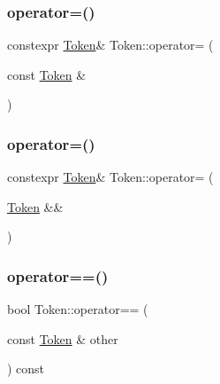 \subsubsection{\texorpdfstring{operator=()}{operator=()}\hspace{0.1cm}{\footnotesize\ttfamily [3/4]}}
{\footnotesize\ttfamily constexpr \hyperlink{class_token}{Token}\& Token\+::operator= (\begin{DoxyParamCaption}\item[{const \hyperlink{class_token}{Token} \&}]{ }\end{DoxyParamCaption})\hspace{0.3cm}{\ttfamily [default]}}

\mbox{\label{class_token_a7fb2d2c0d997137887d41037f47a39ac}} 
\subsubsection{\texorpdfstring{operator=()}{operator=()}\hspace{0.1cm}{\footnotesize\ttfamily [4/4]}}
{\footnotesize\ttfamily constexpr \hyperlink{class_token}{Token}\& Token\+::operator= (\begin{DoxyParamCaption}\item[{\hyperlink{class_token}{Token} \&\&}]{ }\end{DoxyParamCaption})\hspace{0.3cm}{\ttfamily [default]}}

\mbox{\label{class_token_a20c14983ac6c11ffb89135e2cd91169f}} 
\subsubsection{\texorpdfstring{operator==()}{operator==()}\hspace{0.1cm}{\footnotesize\ttfamily [1/2]}}
{\footnotesize\ttfamily bool Token\+::operator== (\begin{DoxyParamCaption}\item[{const \hyperlink{class_token}{Token} \&}]{other }\end{DoxyParamCaption}) const}

\mbox{\label{class_token_a12cec3cf4221ac78a43b9c06e0ae6e8b}} 
